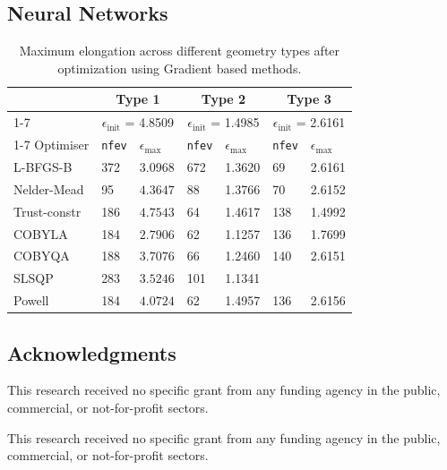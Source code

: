 \documentclass{article}
\begin{document}
\subsection{Neural Networks}

\begin{table}
  \caption{Maximum elongation across different geometry types after optimization using Gradient based methods.}
  \label{scipyoptim}
  \centering
  \begin{tabular}{l|ll|ll|ll}
    \toprule
    & \multicolumn{2}{c|}{Type 1}& \multicolumn{2}{c|}{Type 2}&\multicolumn{2}{c}{Type 3}             \\
    \cmidrule(r){1-7}
    & \multicolumn{2}{c|}{$\epsilon_\text{init}$ = 4.8509}& \multicolumn{2}{c|}{$\epsilon_\text{init}$ = 1.4985}&\multicolumn{2}{c}{$\epsilon_\text{init}$ = 2.6161}             \\
    \cmidrule(r){1-7}
    Optimiser     & \texttt{nfev}     & $\epsilon_\text{max}$ & \texttt{nfev}     & $\epsilon_\text{max}$ & \texttt{nfev}     & $\epsilon_\text{max}$ \\
    \midrule
    L-BFGS-B & 372  & $3.0968$  & 672 & 1.3620 & 69 & 2.6161\\    Nelder-Mead     & 95 & $4.3647$   & 88 & 1.3766 & 70 & 2.6152\\
    Trust-constr     &   186     & $4.7543$  & 64 & 1.4617 & 138 & 1.4992\\
    COBYLA     & 184       & $2.7906$  & 62 & 1.1257 & 136 & 1.7699\\
    COBYQA     & 188       & $3.7076$  & 66 & 1.2460 & 140 & 2.6151\\
    SLSQP     & 283       & $3.5246$  & 101 & 1.1341 & \\
    Powell     &    184    & $4.0724$  & 62 & 1.4957 & 136 & 2.6156\\
    \bottomrule
  \end{tabular}
\end{table}

\subsection*{Acknowledgments}
This research received no specific grant from any funding agency in the public, commercial,
or not-for-profit sectors.

\begin{ack}
This research received no specific grant from any funding agency in the public, commercial, or
not-for-profit sectors.
\end{ack}
\end{document}
